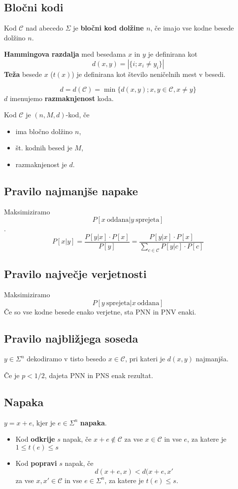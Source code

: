 \begin{multicols}{5}
\section{Bločni kodi}
Kod $\mathcal{C}$ nad abecedo $\Sigma$ je \textbf{bločni kod dolžine $n$}, če imajo vse kodne besede dolžino $n$.

\textbf{Hammingova razdalja} med besedama $x$ in $y$ je definirana kot
\[ d(x,y) = |\{i;x_i\neq y_i\}|\]
\textbf{Teža} besede $x$ ($t(x)$) je definirana kot število neničelnih mest v besedi.

\[d = d(\mathcal{C}) = \min\{d(x,y); x,y\in \mathcal{C}, x \ne y\}\]
$d$ imenujemo \textbf{razmaknjenost} koda.

Kod $\mathcal{C}$ je $(n,M,d)$-kod, če
\begin{itemize}
	\item ima bločno dolžino $n$,
	\item št. kodnih besed je $M$,
	\item razmaknjenost je $d$.
\end{itemize}

\subsection{Pravilo najmanjše napake}
Maksimiziramo
\[P[x\ \text{oddana}|y\ \text{sprejeta}]\].
\[P[x|y] = \frac{P[y|x]\cdot P[x]}{P[y]} = \frac{P[y|x]\cdot P[x]}{\sum_{c\in\mathcal{C}}P[y|c]\cdot P[c]}\]
\subsection{Pravilo največje verjetnosti}
Maksimiziramo
\[P[y\ \text{sprejeta}|x\ \text{oddana}]\]
Če so vse kodne besede enako verjetne, sta PNN in PNV enaki.
\subsection{Pravilo najbližjega soseda}
$y\in \Sigma^n$ dekodiramo v tisto besedo $x\in \mathcal{C}$, pri kateri je $d(x,y)$ najmanjša.

Če je $p<1/2$, dajeta PNN in PNS enak rezultat.

\subsection{Napaka}
$y = x+e$, kjer je $e\in \Sigma^n$ \textbf{napaka}.
\begin{itemize}
	\item Kod \textbf{odkrije} $s$ napak, če $x+e\notin \mathcal{C}$ za vse $x\in \mathcal{C}$
		in vse $e$, za katere je $1\le t(e)\le s$
	\item Kod \textbf{popravi} $s$ napak, če
		\[d(x+e,x)<d(x+e,x\prime\]
		za vse $x,x\prime\in\mathcal{C}$ in vse $e\in\Sigma^n$, za katere je $t(e)\le s$.
\end{itemize}

\end{multicols}
